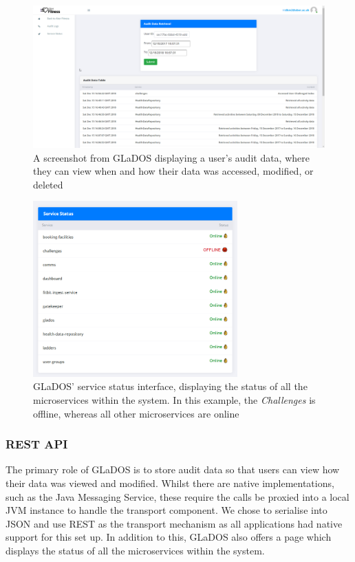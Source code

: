 \begin{figure}[H]
    \centering
    \includegraphics[width=\textwidth]{Images/service_glados.png}
    \caption{A screenshot from GLaDOS displaying a user's audit data, where they can view when and how their data was accessed, modified, or deleted}
\end{figure}

\begin{figure}[H]
    \centering
    \includegraphics[width=0.7\textwidth]{Images/service_status.png}
    \caption{GLaDOS' service status interface, displaying the status of all the microservices within the system. In this example, the \textit{Challenges} is offline, whereas all other microservices are online}
\end{figure}

\subsubsection{REST API}
\par
The primary role of GLaDOS is to store audit data so that users can view how their data was viewed and modified. Whilst there are native implementations, such as the Java Messaging Service, these require the calls be proxied into a local JVM instance to handle the transport component. We chose to serialise into JSON and use REST as the transport mechanism as all applications had native support for this set up. In addition to this, GLaDOS also offers a page which displays the status of all the microservices within the system.

